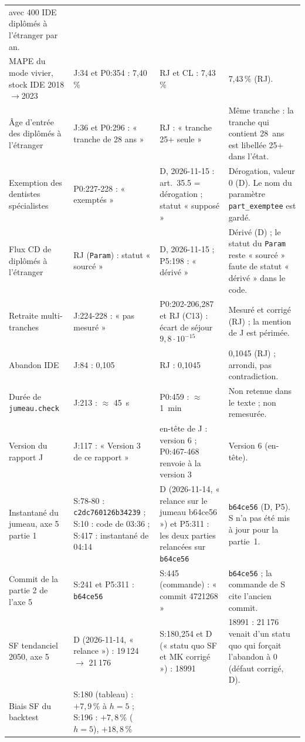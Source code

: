 {\begin{longtable}{@{}p{2.9cm}p{3.5cm}p{3.5cm}p{4.7cm}@{}}
  avec 400 IDE diplômés à l'étranger par an. \\
MAPE du mode vivier, stock IDE 2018$\to$2023 & J:34 et P0:354 : 7,40\,\% & RJ et CL : 7,43\,\% & 7,43\,\% (RJ). \\
Âge d'entrée des diplômés à l'étranger & J:36 et P0:296 : « tranche de 28 ans » & RJ : « tranche 25+ seule » & Même
  tranche : la tranche qui contient 28~ans est libellée 25+ dans l'état. \\
Exemption des dentistes spécialistes & P0:227-228 : « exemptés » & D, 2026-11-15 : art.~35.5 = dérogation ; statut
  « supposé » & Dérogation, valeur 0 (D). Le nom du paramètre \texttt{part\_exemptee} est gardé. \\
Flux CD de diplômés à l'étranger & RJ (\texttt{Param}) : statut « sourcé » & D, 2026-11-15 ; P5:198 : « dérivé » &
  Dérivé (D) ; le statut du \texttt{Param} reste « sourcé » faute de statut « dérivé » dans le code. \\
Retraite multi-tranches & J:224-228 : « pas mesuré » & P0:202-206,287 et RJ (C13) : écart de séjour
  $9{,}8\cdot10^{-15}$ & Mesuré et corrigé (RJ) ; la mention de J est périmée. \\
Abandon IDE & J:84 : 0,105 & RJ : 0,1045 & 0,1045 (RJ) ; arrondi, pas contradiction. \\
Durée de \texttt{jumeau.check} & J:213 : $\approx$ 45~s & P0:459 : $\approx$ 1~min & Non retenue dans le texte ; non
  remesurée. \\
Version du rapport J & J:117 : « Version 3 de ce rapport » & en-tête de J : version 6 ; P0:467-468 renvoie à la
  version 3 & Version 6 (en-tête). \\
Instantané du jumeau, axe 5 partie 1 & S:78-80 : \texttt{c2dc760126b34239} ; S:10 : code de 03:36 ; S:417 :
  instantané de 04:14 & D (2026-11-14, « relance sur le jumeau b64ce56 ») et P5:311 : les deux parties relancées sur
  \texttt{b64ce56} & \texttt{b64ce56} (D, P5). S n'a pas été mis à jour pour la partie~1. \\
Commit de la partie 2 de l'axe 5 & S:241 et P5:311 : \texttt{b64ce56} & S:445 (commande) : « commit 4721268 » &
  \texttt{b64ce56} ; la commande de S cite l'ancien commit. \\
SF tendanciel 2050, axe 5 & D (2026-11-14, « relance ») : 19\,124 $\to$ 21\,176 & S:180,254 et D (« statu quo SF
  et MK corrigé ») : \num{18991} & \num{18991} : 21\,176 venait d'un statu quo qui forçait l'abandon à 0
  (défaut corrigé, D). \\
Biais SF du backtest & S:180 (tableau) : $+7{,}9$\,\% à $h = 5$ ; S:196 : $+7{,}8$\,\% ($h = 5$), $+18{,}8$\,\%

\end{longtable}}
